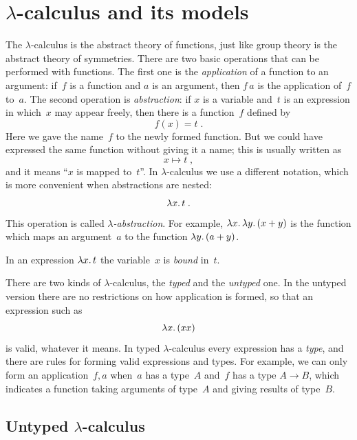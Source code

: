 \section{$\lambda$-calculus and its models}
\label{sec:lambda-calculus}


The $\lambda$-calculus is the abstract theory of functions, just like
group theory is the abstract theory of symmetries. There are two basic
operations that can be performed with functions. The first one is the
\emph{application} of a function to an argument: if~$f$ is a function
and $a$ is an argument, then $f\, a$ is the application of~$f$ to~$a$.
The second operation is \emph{abstraction}: if $x$ is a variable
and~$t$ is an expression in which~$x$ may appear freely, then there is
a function~$f$ defined by
%
\begin{equation*}
  f(x) = t \;.
\end{equation*}
%
Here we gave the name~$f$ to the newly formed function. But we could
have expressed the same function without giving it a name;
this is usually written as
%
\begin{equation*}
  x \mapsto t \;,
\end{equation*}
%
and it means ``$x$ is mapped to~$t$''. In $\lambda$-calculus we use a
different notation, which is more convenient when abstractions are
nested:
%
\begin{equation*}
  \lambda x .\,t \;.
\end{equation*}
%
This operation is called \emph{$\lambda$-abstraction}. For example,
$\lambda x .\,\lambda y .\left(x + y\right)$ is the function which maps an
argument~$a$ to the function $\lambda y .\left(a + y\right)$.

In an expression $\lambda x .\,t$ the variable~$x$ is \emph{bound}
in~$t$.

There are two kinds of $\lambda$-calculus, the \emph{typed} and the
\emph{untyped} one. In the untyped version there are no restrictions
on how application is formed, so that an expression such as
%
\begin{equation*}
  \lambda x .\left(x x\right)
\end{equation*}
%
is valid, whatever it means. In typed $\lambda$-calculus every
expression has a \emph{type}, and there are rules for forming valid
expressions and types. For example, we can only form an
application~$f, a$ when~$a$ has a type~$A$ and~$f$ has a type $A \to
B$, which indicates a function taking arguments of type~$A$ and giving
results of type~$B$.

\subsection{Untyped $\lambda$-calculus}
\label{sec:untyped-lambda-calculus}

